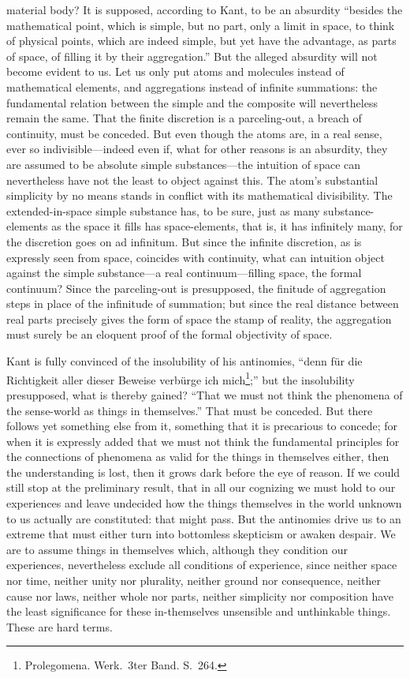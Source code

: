 \documentclass[12pt]{article}
\begin{document}
material body? It is supposed, according to Kant, to be an absurdity
``besides the mathematical point, which is simple, but no part, only a
limit in space, to think of physical points, which are indeed simple, but
yet have the advantage, as parts of space, of filling it by their
aggregation.'' But the alleged absurdity will not become evident to us. Let
us only put atoms and molecules instead of mathematical elements, and
aggregations instead of infinite summations: the fundamental relation
between the simple and the composite will nevertheless remain the same.
That the finite discretion is a parceling-out, a breach of continuity, must
be conceded. But even though the atoms are, in a real sense, ever so
indivisible—indeed even if, what for other reasons is an absurdity, they
are assumed to be absolute simple substances—the intuition of space can
nevertheless have not the least
to object against this. The atom's substantial simplicity by no means
stands in conflict with its mathematical divisibility. The extended-in-space
simple substance has, to be sure, just as many substance-elements as the
space it fills has space-elements, that is, it has infinitely many, for the
discretion goes on ad infinitum. But since the infinite discretion, as is
expressly seen from space, coincides with continuity, what can intuition
object against the simple substance—a real continuum—filling space, the
formal continuum? Since the parceling-out is presupposed, the finitude of
aggregation steps in place of the infinitude of summation; but since the
real distance between real parts precisely gives the form of space the
stamp of reality, the aggregation must surely be an eloquent proof of the
formal objectivity of space.

Kant is fully convinced of the insolubility of his antinomies, ``denn für
die Richtigkeit aller dieser Beweise verbürge ich mich\footnote{Prolegomena.
Werk.\ 3ter Band. S.~264.};'' but the insolubility presupposed, what is
thereby gained? ``That we must not think the phenomena of the sense-world
as things in themselves.'' That must be conceded. But there follows yet
something else from it, something that it is precarious to concede; for when
it is expressly added that we must not think the fundamental principles for
the connections of phenomena as valid for the things in themselves either,
then the understanding is lost, then it grows dark before the eye of reason.
If we could still stop at the preliminary result, that in all our cognizing
we must hold to our experiences and leave undecided how the things
themselves in the world unknown to us actually are constituted: that might
pass. But the antinomies drive us to an extreme that must either turn into
bottomless skepticism or awaken despair. We are to assume things in
themselves which, although they condition our experiences, nevertheless
exclude all conditions of experience, since neither space nor time, neither
unity nor plurality, neither ground nor consequence, neither cause nor laws,
neither whole nor parts, neither simplicity nor composition have the least
significance for these in-themselves unsensible and unthinkable things.
These are hard terms.
\end{document}
